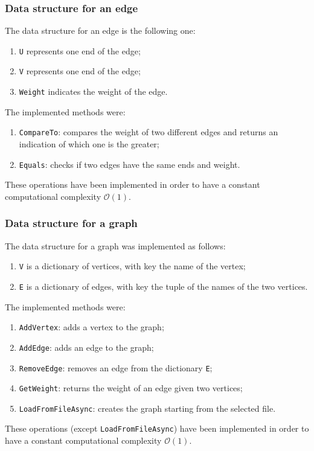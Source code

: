 \subsubsection{Data structure for an edge}
The data structure for an edge is the following one:
\begin{enumerate}
    \item \verb|U| represents one end of the edge;
    \item \verb|V| represents one end of the edge;
    \item \verb|Weight| indicates the weight of the edge.
    \end{enumerate}
\noindent
The implemented methods were:
\begin{enumerate}
    \item \verb|CompareTo|: compares the weight of two different edges and returns an indication of which one is the greater;
    \item \verb|Equals|: checks if two edges have the same ends and weight.
\end{enumerate}
These operations have been implemented in order to have a constant computational complexity $\mathcal{O}(1)$.

\subsubsection{Data structure for a graph}
The data structure for a graph was implemented as follows:
\begin{enumerate}
    \item \verb|V| is a dictionary of vertices, with key the name of the vertex;
    \item \verb|E| is a dictionary of edges, with key the tuple of the names of the two vertices.
    \end{enumerate}
\noindent
The implemented methods were:
\begin{enumerate}
    \item \verb|AddVertex|: adds a vertex to the graph;
    \item \verb|AddEdge|: adds an edge to the graph;
    \item \verb|RemoveEdge|: removes an edge from the dictionary \verb|E|;
    \item \verb|GetWeight|: returns the weight of an edge given two vertices;
    \item \verb|LoadFromFileAsync|: creates the graph starting from the selected file.
\end{enumerate}
These operations (except \verb|LoadFromFileAsync|) have been implemented in order to have a constant computational complexity $\mathcal{O}(1)$.

